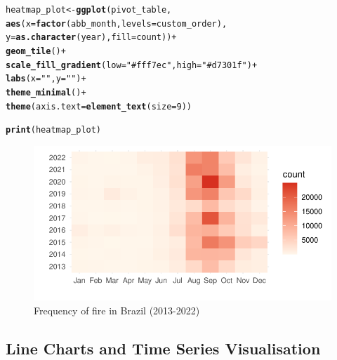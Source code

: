 \documentclass{article}\usepackage[]{graphicx}\usepackage[]{xcolor}
\makeatletter
\def\maxwidth{ %
  \ifdim\Gin@nat@width>\linewidth
    \linewidth
  \else
    \Gin@nat@width
  \fi
}
\newcommand{\hlnum}[1]{\textcolor[rgb]{0.686,0.059,0.569}{#1}}%
\newcommand{\hlstr}[1]{\textcolor[rgb]{0.192,0.494,0.8}{#1}}%
\newcommand{\hlopt}[1]{\textcolor[rgb]{0,0,0}{#1}}%
\newcommand{\hlstd}[1]{\textcolor[rgb]{0.345,0.345,0.345}{#1}}%
\newcommand{\hlkwb}[1]{\textcolor[rgb]{0.69,0.353,0.396}{#1}}%
\newcommand{\hlkwc}[1]{\textcolor[rgb]{0.333,0.667,0.333}{#1}}%
\newcommand{\hlkwd}[1]{\textcolor[rgb]{0.737,0.353,0.396}{\textbf{#1}}}%
\newenvironment{kframe}{%
 \def\at@end@of@kframe{}%
 \ifinner\ifhmode%
  \def\at@end@of@kframe{\end{minipage}}%
  \begin{minipage}{\columnwidth}%
 \fi\fi%
 \def\FrameCommand##1{\hskip\@totalleftmargin \hskip-\fboxsep
 \colorbox{shadecolor}{##1}\hskip-\fboxsep
     \hskip-\linewidth \hskip-\@totalleftmargin \hskip\columnwidth}%
 \MakeFramed {\advance\hsize-\width
   \@totalleftmargin\z@ \linewidth\hsize
   \@setminipage}}%
 {\par\unskip\endMakeFramed%
 \at@end@of@kframe}
\newenvironment{knitrout}{}{} %
\makeatother
\begin{document}
\begin{knitrout}\scriptsize
{}\color{fgcolor}\begin{kframe}
\begin{alltt}
\hlstd{heatmap_plot} \hlkwb{<-} \hlkwd{ggplot}\hlstd{(pivot_table,}
                       \hlkwd{aes}\hlstd{(}\hlkwc{x} \hlstd{=} \hlkwd{factor}\hlstd{(abb_month,} \hlkwc{levels} \hlstd{= custom_order),}
                           \hlkwc{y} \hlstd{=} \hlkwd{as.character}\hlstd{(year),} \hlkwc{fill} \hlstd{= count))} \hlopt{+}
  \hlkwd{geom_tile}\hlstd{()} \hlopt{+}
  \hlkwd{scale_fill_gradient}\hlstd{(}\hlkwc{low} \hlstd{=} \hlstr{"#fff7ec"}\hlstd{,} \hlkwc{high} \hlstd{=} \hlstr{"#d7301f"}\hlstd{)} \hlopt{+}
  \hlkwd{labs}\hlstd{(}\hlkwc{x} \hlstd{=} \hlstr{" "}\hlstd{,} \hlkwc{y} \hlstd{=} \hlstr{" "}\hlstd{)} \hlopt{+}
  \hlkwd{theme_minimal}\hlstd{()} \hlopt{+}
  \hlkwd{theme}\hlstd{(}\hlkwc{axis.text} \hlstd{=} \hlkwd{element_text}\hlstd{(}\hlkwc{size} \hlstd{=} \hlnum{9}\hlstd{))}

\hlkwd{print}\hlstd{(heatmap_plot)}
\end{alltt}
\end{kframe}\begin{figure}[H]

{\centering \includegraphics[width=\maxwidth]{figure/beamer-fire-by-months-fy13-22-1} 

}

\caption[Frequency of fire in Brazil (2013-2022)]{Frequency of fire in Brazil (2013-2022)}\label{fig:fire-by-months-fy13-22}
\end{figure}

\end{knitrout}



\subsection{Line Charts and Time Series Visualisation}
\end{document}
